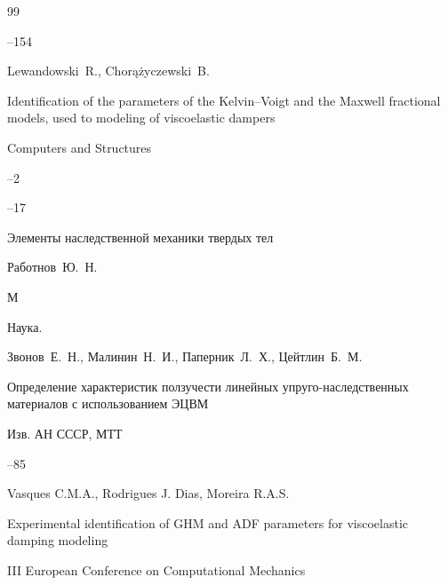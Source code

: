 \documentclass[11pt,a4paper,twoside]{article}
\begin{document}
\begin{thebibliography}{99}


--154









\by Lewandowski~R., \Russian Chor\k{a}\.zyczewski~B.


\paper  Identification of the parameters of the Kelvin--Voigt and the Maxwell fractional models, used to modeling of viscoelastic dampers 


\jour Computers and Structures




--2




--17









\book Элементы наследственной механики твердых тел


\by Работнов~Ю.~Н.


\publaddr М


\publ Наука. 














\by	Звонов~Е.~Н., Малинин~Н.~И., Паперник~Л.~Х., Цейтлин~Б.~М.


\paper Определение характеристик ползучести линейных упруго-наследственных материалов с использованием ЭЦВМ


\jour  Изв. АН СССР, МТТ






–85







\by Vasques C.M.A., Rodrigues J. Dias,  Moreira R.A.S.


\paper Experimental identification of GHM and ADF parameters for viscoelastic damping modeling


\inbook III European Conference on Computational Mechanics



\end{thebibliography}
\end{document}
